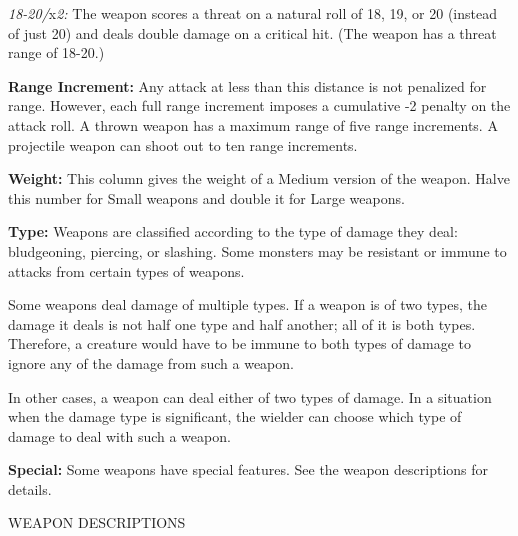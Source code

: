 \documentclass{article}
\begin{document}
\textit{18-20/}x\textit{2: }The weapon scores a threat on a natural roll of 18, 
19, or 20 (instead of just 20) and deals double damage on a critical hit. (The 
weapon has a threat range of 18-20.)

\textbf{Range Increment:} Any attack at less than this distance is not penalized 
for range. However, each full range increment imposes a cumulative -2 penalty on 
the attack roll. A thrown weapon has a maximum range of five range increments. 
A projectile weapon can shoot out to ten range increments.

\textbf{Weight:} This column gives the weight of a Medium version of the weapon. 
Halve this number for Small weapons and double it for Large weapons.

\textbf{Type:} Weapons are classified according to the type of damage they deal: 
bludgeoning, piercing, or slashing. Some monsters may be resistant or immune to 
attacks from certain types of weapons.

Some weapons deal damage of multiple types. If a weapon is of two types, the damage 
it deals is not half one type and half another; all of it is both types. Therefore, 
a creature would have to be immune to both types of damage to ignore any of the 
damage from such a weapon.

In other cases, a weapon can deal either of two types of damage. In a situation 
when the damage type is significant, the wielder can choose which type of damage 
to deal with such a weapon.

\textbf{Special:} Some weapons have special features. See the weapon descriptions 
for details.

\vspace{12pt}
WEAPON DESCRIPTIONS
\end{document}
